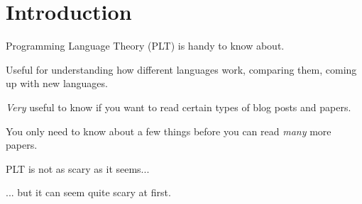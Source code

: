 
\section{Introduction}

\begin{frame}
  Programming Language Theory (PLT) is handy to know about.
\end{frame}

\begin{frame}
  Useful for understanding how different languages work, comparing them, coming
  up with new languages.
\end{frame}

\begin{frame}
  {\it Very} useful to know if you want to read certain types of blog posts and papers.
\end{frame}

\begin{frame}
  You only need to know about a few things before you can read {\it many} more papers.
\end{frame}

\begin{frame}
  PLT is not as scary as it seems...
\end{frame}

\begin{frame}
  ... but it can seem quite scary at first.
\end{frame}


